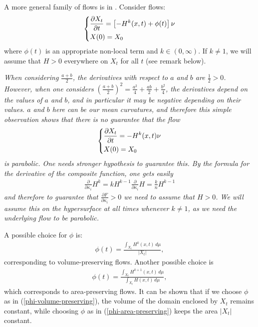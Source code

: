 A more general family of flows is in \cite{calcvar15}. Consider flows: 
\begin{align}
	\begin{dcases}
		\frac{\partial X_t}{\partial t} = \left[- H^k(x, t) + \phi(t)\right] \nu\\
		X(0)= X_0
	\end{dcases} \label{chapter 4 equation}
\end{align}
where $\phi(t)$ is an appropriate non-local term and $k\in (0, \infty)$. If $k\neq 1$, we will assume that  $H>0$ everywhere on $X_t$ for all $t$ (see remark below). 
\begin{oss}\em
	When considering $\frac{a+b}{2}$, the derivatives with respect to $a$ and $b$ are $\frac{1}{2}>0$. However, when one considers $ \left(\frac{a+b}{2}\right)^2=\frac{a^2}{4} + \frac{ab}{2} +\frac{b^2}{4} $,
	the derivatives depend on the values of $a$ and $b$, and in particular it may be negative depending on their values. $a$ and $b$ here can be our mean curvatures, and therefore this simple observation shows that there is no guarantee that the flow 
	\begin{align*}
		\begin{dcases}
			\frac{\partial X_t}{\partial t} = - H^k(x, t)  \nu\\
			X(0)= X_0
		\end{dcases} 
	\end{align*}
	is parabolic. One needs stronger hypothesis to guarantee this. By the formula for the derivative of the composite function, one gets easily
	\begin{align*}
		\frac{\partial }{\partial \kappa_i}  H^k =  k H^{k-1} \frac{\partial }{\partial \kappa_i}  H = \frac{k}{n} H^{k-1}
	\end{align*}
	and therefore to guarantee that $\frac{\partial F}{\partial \kappa_i} > 0$ we need to assume that $H>0$. We will assume this on the hypersurface at all times whenever $k\neq 1$, as we need the underlying flow to be parabolic.
\end{oss}
A possible choice for $\phi$ is: 
\begin{align}
	\phi(t) = \frac{\int_{X_t} H^k(x, t) \, d\mu}{|X_t|}, \label{phi-volume-preserving}
\end{align}
corresponding to volume-preserving flows. Another possible choice is
\begin{align}
	\phi(t) = \frac{\int_{X_t} H^{k+1}(x, t) \, d\mu}{\int_{X_t} H(x, t) \, d\mu}, \label{phi-area-preserving}
\end{align}
which corresponds to area-preserving flows. It can be shown that if we choose $\phi$ as in (\ref{phi-volume-preserving}), the volume of the domain enclosed by $X_t$ remains constant, while choosing $\phi$ as in (\ref{phi-area-preserving}) keeps the area $|X_t|$ constant. 

